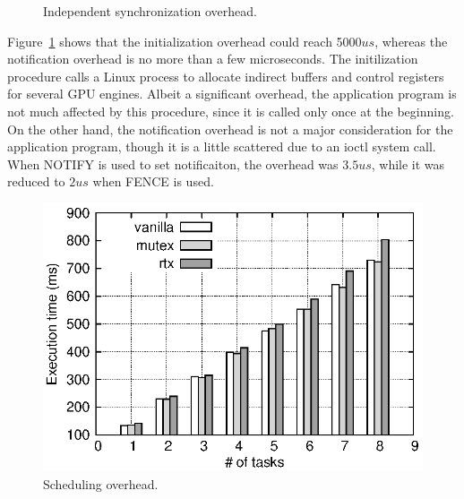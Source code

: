 \begin{figure}[!t]
\begin{center}
\caption{Independent synchronization overhead.}
\label{fig:irq_rise_overhead}
\end{center}
\end{figure}

Figure~\ref{fig:irq_rise_overhead} shows that the initialization
overhead could reach 5000$us$, whereas the notification overhead is no
more than a few microseconds.
The initilization procedure calls a Linux process to allocate indirect
buffers and control registers for several GPU engines.
Albeit a significant overhead, the application program is not much
affected by this procedure, since it is called only once at the
beginning.
On the other hand, the notification overhead is not a major
consideration for the application program, though it is a little
scattered due to an ioctl system call.
When NOTIFY is used to set notificaiton, the overhead was $3.5us$, while
it was reduced to $2us$ when FENCE is used.

\label{sec:eval:sched_overhead}

\begin{figure}[!t]
\begin{center}
\includegraphics[width=.44\textwidth]{img/sum_task.eps}
\caption{Scheduling overhead.}
\label{fig:fp_task_overhead}
\end{center}
\end{figure}

